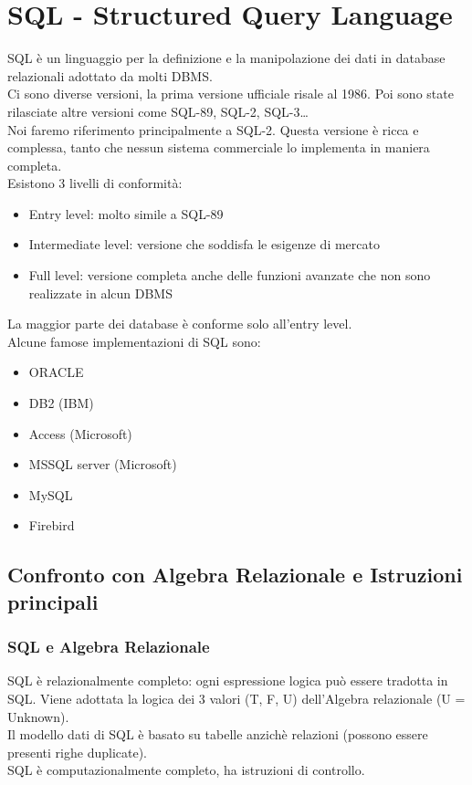 \chapter{SQL - Structured Query Language}
SQL è un linguaggio per la definizione e la manipolazione dei dati
in database relazionali adottato da molti DBMS. \\
Ci sono diverse versioni, la prima versione ufficiale risale al 1986.
Poi sono state rilasciate altre versioni come SQL-89, SQL-2, SQL-3\dots\\
Noi faremo riferimento principalmente a SQL-2. Questa versione è ricca e complessa,
tanto che nessun sistema commerciale lo implementa in maniera completa.\\
Esistono 3 livelli di conformità:
\begin{itemize}
  \item Entry level: molto simile a SQL-89
  \item Intermediate level: versione che soddisfa le esigenze di mercato
  \item Full level: versione completa anche delle funzioni avanzate che non sono realizzate
        in alcun DBMS
\end{itemize}
La maggior parte dei database è conforme solo all'entry level.\\
Alcune famose implementazioni di SQL sono:
\begin{itemize}
  \item ORACLE
  \item DB2 (IBM)
  \item Access (Microsoft)
  \item MSSQL server (Microsoft)
  \item MySQL
  \item Firebird
\end{itemize}
\section{Confronto con Algebra Relazionale e Istruzioni principali}
\subsection{SQL e Algebra Relazionale}
SQL è relazionalmente completo: ogni espressione logica può essere tradotta in SQL.
Viene adottata la logica dei 3 valori (T, F, U) dell'Algebra relazionale (U = Unknown).\\
Il modello dati di SQL è basato su tabelle anzichè relazioni (possono essere presenti righe duplicate).\\
SQL è computazionalmente completo, ha istruzioni di controllo.\\
